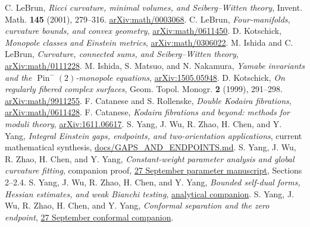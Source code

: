 \documentclass[11pt,a4paper]{article}
\theoremstyle{definition}
\theoremstyle{remark}
\newcommand{\repo}[2]{\href{https://github.com/Cherish0925/Geometric-Analysis/blob/main/#1}{#2}}
\begin{document}
\begin{thebibliography}{99}
 C. LeBrun, \emph{Ricci curvature, minimal volumes, and Seiberg--Witten theory}, Invent. Math. \textbf{145} (2001), 279--316. \href{https://arxiv.org/abs/math/0003068}{arXiv:math/0003068}.
 C. LeBrun, \emph{Four-manifolds, curvature bounds, and convex geometry}, \href{https://arxiv.org/abs/math/0611450}{arXiv:math/0611450}.
 D. Kotschick, \emph{Monopole classes and Einstein metrics}, \href{https://arxiv.org/abs/math/0306022}{arXiv:math/0306022}.
 M. Ishida and C. LeBrun, \emph{Curvature, connected sums, and Seiberg--Witten theory}, \href{https://arxiv.org/abs/math/0111228}{arXiv:math/0111228}.
 M. Ishida, S. Matsuo, and N. Nakamura, \emph{Yamabe invariants and the $\operatorname{Pin}^{-}(2)$-monopole equations}, \href{https://arxiv.org/abs/1505.05948}{arXiv:1505.05948}.
 D. Kotschick, \emph{On regularly fibered complex surfaces}, Geom. Topol. Monogr. \textbf{2} (1999), 291--298. \href{https://arxiv.org/abs/math/9911255}{arXiv:math/9911255}.
 F. Catanese and S. Rollenske, \emph{Double Kodaira fibrations}, \href{https://arxiv.org/abs/math/0611428}{arXiv:math/0611428}.
 F. Catanese, \emph{Kodaira fibrations and beyond: methods for moduli theory}, \href{https://arxiv.org/abs/1611.06617}{arXiv:1611.06617}.
 S. Yang, J. Wu, R. Zhao, H. Chen, and Y. Yang, \emph{Integral Einstein gaps, endpoints, and two-orientation applications}, current mathematical synthesis, \repo{docs/GAPS_AND_ENDPOINTS.md}{docs/GAPS\_AND\_ENDPOINTS.md}.
 S. Yang, J. Wu, R. Zhao, H. Chen, and Y. Yang, \emph{Constant-weight parameter analysis and global curvature fitting}, companion proof, \repo{research/packages/20261007_Einstein_Gaps_Two_Sessions--9d4f2de3/20261007_Einstein_Gaps_Two_Sessions/sources/Skills/geometric-analysis/research/sources/continuation/20260927_constant_weight_and_global_fit.md}{27 September parameter manuscript}, Sections 2--2.4.
 S. Yang, J. Wu, R. Zhao, H. Chen, and Y. Yang, \emph{Bounded self-dual forms, Hessian estimates, and weak Bianchi testing}, \repo{research/packages/20261007_Einstein_Gaps_Two_Sessions--9d4f2de3/20261007_Einstein_Gaps_Two_Sessions/sources/Skills/geometric-analysis/research/sources/mathematics/current/round21_analytic.md}{analytical companion}.
 S. Yang, J. Wu, R. Zhao, H. Chen, and Y. Yang, \emph{Conformal separation and the zero endpoint}, \repo{research/packages/20261007_Einstein_Gaps_Two_Sessions--9d4f2de3/20261007_Einstein_Gaps_Two_Sessions/sources/Skills/geometric-analysis/research/sources/continuation/20260927_conformal_separation_and_zero_end.md}{27 September conformal companion}.

\end{thebibliography}
\end{document}
